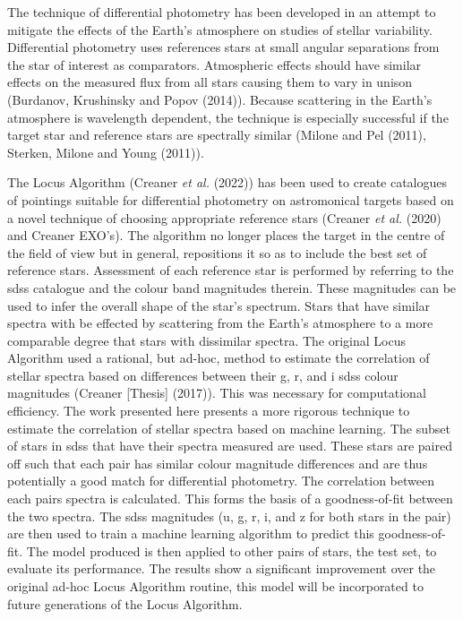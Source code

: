 \documentclass[a4paper,fleqn,usenatbib]{mnras}
\begin{document}
The technique of differential photometry has been developed in an
attempt to mitigate the effects of the Earth's atmosphere on studies of
stellar variability. Differential photometry uses references stars at
small angular separations from the star of interest as comparators.
Atmospheric effects should have similar effects on the measured flux
from all stars causing them to vary in unison (Burdanov, Krushinsky and
Popov (2014)). Because scattering in the Earth's atmosphere is
wavelength dependent, the technique is especially successful if the
target star and reference stars are spectrally similar (Milone and Pel
(2011), Sterken, Milone and Young (2011)).

The Locus Algorithm (Creaner \emph{et al.} (2022)) has been used to
create catalogues of pointings suitable for differential photometry on
astromonical targets based on a novel technique of choosing appropriate
reference stars (Creaner \emph{et al.} (2020) and Creaner EXO's). The
algorithm no longer places the target in the centre of the field of view
but in general, repositions it so as to include the best set of
reference stars. Assessment of each reference star is performed by
referring to the sdss catalogue and the colour band magnitudes therein.
These magnitudes can be used to infer the overall shape of the star's
spectrum. Stars that have similar spectra with be effected by scattering
from the Earth's atmosphere to a more comparable degree that stars with
dissimilar spectra. The original Locus Algorithm used a rational, but
ad-hoc, method to estimate the correlation of stellar spectra based on
differences between their g, r, and i sdss colour magnitudes (Creaner
{[}Thesis{]} (2017)). This was necessary for computational efficiency.
The work presented here presents a more rigorous technique to estimate
the correlation of stellar spectra based on machine learning. The subset
of stars in sdss that have their spectra measured are used. These stars
are paired off such that each pair has similar colour magnitude
differences and are thus potentially a good match for differential
photometry. The correlation between each pairs spectra is calculated.
This forms the basis of a goodness-of-fit between the two spectra. The
sdss magnitudes (u, g, r, i, and z for both stars in the pair) are then
used to train a machine learning algorithm to predict this
goodness-of-fit. The model produced is then applied to other pairs of
stars, the test set, to evaluate its performance. The results show a
significant improvement over the original ad-hoc Locus Algorithm
routine, this model will be incorporated to future generations of the
Locus Algorithm.
\end{document}
